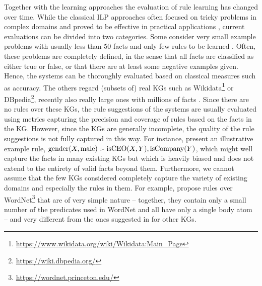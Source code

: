 


Together with the learning approaches the evaluation of rule learning has changed over time.
While the classical ILP approaches often focused on tricky problems in complex domains \cite{ilpdatasets,Quinlan-ML90:foil} and proved to be effective in practical applications \cite{...}, 
current evaluations can be divided into two categories. 
Some consider very small example problems with usually less than 50 facts and only few rules to be learned \cite{EGre-jair18:learning-explanatory-rules,Dong+-ICLR19:nlms}. Often, these problems are completely defined, in the sense that all facts are classified as either true or false, or that there are at least some negative examples given.
Hence, the systems can be thoroughly evaluated based on classical measures such as accuracy.
The others regard (subsets of) real KGs such as Wikidata\footnote{\url{https://www.wikidata.org/wiki/Wikidata:Main_Page}}
or DBpedia\footnote{\url{https://wiki.dbpedia.org/}}, 
recently also really large ones with millions of facts \cite{Galarraga+-VLDBJ15:amiep,OWaWa-IJCAI18:scalable-rule-learning,Ho+-ISWC18:guided-by-embedding}. Since there are no rules over these KGs, the rule suggestions of the systems are usually evaluated using metrics capturing the precision and coverage of rules \cite{Galarraga+-VLDBJ15:amiep}
based on the facts in the KG.
However, since the KGs are generally incomplete, the quality of the rule suggestions is not fully captured in this way. For instance, \cite{OWaWa-IJCAI18:scalable-rule-learning} present an illustrative example rule, 
$\textrm{gender}(X,\textrm{male})\text{ :- }\textrm{isCEO}(X,Y),\textrm{isCompany}(Y)$,
which might well capture the facts in many existing KGs but which is heavily biased and does not extend to the entirety of valid facts beyond them.
Furthermore, we cannot assume that the few KGs considered completely capture the variety of existing domains and especially the rules in them. For example, \cite{Minervini+-NAMPI18:ntp-at-scale} propose rules over WordNet\footnote{\url{https://wordnet.princeton.edu/}} that are of very simple nature -- together, they contain only a small number of the predicates used in WordNet and all have only a single body atom -- and very different from the ones suggested in \cite{Galarraga+-VLDBJ15:amiep} for other KGs.


